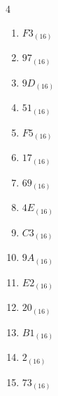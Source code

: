 \begin{multicols}{4}
\begin{enumerate}
        \phantom{$=139$}

  \item $F3_{(16)}$

        \phantom{$=243$}

  \item $97_{(16)}$

        \phantom{$=151$}

  \item $9D_{(16)}$

        \phantom{$=157$}

  \item $51_{(16)}$

        \phantom{$=81$}

  \item $F5_{(16)}$

        \phantom{$=245$}

  \item $17_{(16)}$

        \phantom{$=23$}

  \item $69_{(16)}$

        \phantom{$=105$}

  \item $4E_{(16)}$

        \phantom{$=78$}

  \item $C3_{(16)}$

        \phantom{$=195$}

  \item $9A_{(16)}$

        \phantom{$=154$}

  \item $E2_{(16)}$

        \phantom{$=226$}

  \item $20_{(16)}$

        \phantom{$=32$}

\columnbreak %

\resetques

  \item $B1_{(16)}$

        \phantom{$=177$}

  \item $2_{(16)}$

        \phantom{$=2$}

  \item $73_{(16)}$


\end{enumerate}
\end{multicols}
